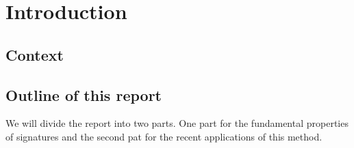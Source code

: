 \section{Introduction}\label{sec:introduction}

\subsection{Context}%
\label{sub:context}




\subsection{Outline of this report}%
\label{sub:outline_of_this_report}

We will divide the report into two parts. One part for the fundamental properties of signatures and the second pat for the recent applications of this method.



